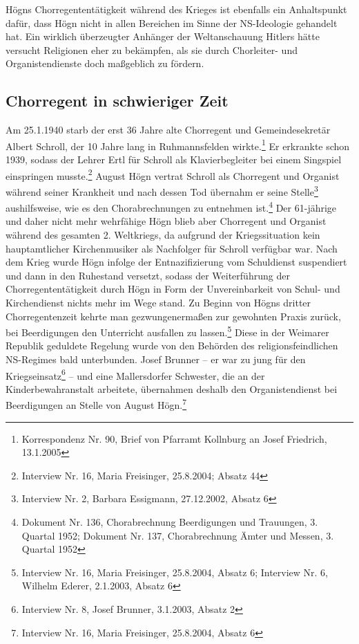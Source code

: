 \documentclass[a4paper]{article}
\begin{document}
Högns Chorregententätigkeit während des Krieges ist ebenfalls ein
Anhaltspunkt dafür, dass Högn nicht in allen Bereichen im Sinne der
NS-Ideologie gehandelt hat. Ein wirklich überzeugter Anhänger der
Weltanschauung Hitlers hätte versucht Religionen eher zu bekämpfen, als
sie durch Chorleiter- und Organistendienste doch maßgeblich zu fördern.

\subsection{Chorregent in schwieriger Zeit}
\hypertarget{RefHeadingToc100333735}{}Am 25.1.1940 starb der erst 36
Jahre alte Chorregent und Gemeindesekretär Albert Schroll, der 10 Jahre
lang in Ruhmannsfelden wirkte.\footnote{ Korrespondenz Nr. 90, Brief
von Pfarramt Kollnburg an Josef Friedrich, 13.1.2005} Er erkrankte
schon 1939, sodass der Lehrer Ertl für Schroll als Klavierbegleiter bei
einem Singspiel einspringen musste.\footnote{ Interview Nr. 16, Maria
Freisinger, 25.8.2004; Absatz 44} August Högn vertrat Schroll als
Chorregent und Organist während seiner Krankheit und nach dessen Tod
übernahm er seine Stelle\footnote{ Interview Nr. 2, Barbara Essigmann,
27.12.2002, Absatz 6} aushilfsweise, wie es den Chorabrechnungen zu
entnehmen ist.\footnote{ Dokument Nr. 136, Chorabrechnung Beerdigungen
und Trauungen, 3. Quartal 1952; Dokument Nr. 137, Chorabrechnung Ämter
und Messen, 3. Quartal 1952} Der 61-jährige und daher nicht mehr
wehrfähige Högn blieb aber Chorregent und Organist während des gesamten
2. Weltkriegs, da aufgrund der Kriegssituation kein hauptamtlicher
Kirchenmusiker als Nachfolger für Schroll verfügbar war. Nach dem Krieg
wurde Högn infolge der Entnazifizierung vom Schuldienst suspendiert und
dann in den Ruhestand versetzt, sodass der Weiterführung der
Chorregententätigkeit durch Högn in Form der Unvereinbarkeit von Schul-
und Kirchendienst nichts mehr im Wege stand. Zu Beginn von Högns
dritter Chorregentenzeit kehrte man gezwungenermaßen zur gewohnten
Praxis zurück, bei Beerdigungen den Unterricht ausfallen zu
lassen.\footnote{ Interview Nr. 16, Maria Freisinger, 25.8.2004, Absatz
6; Interview Nr. 6, Wilhelm Ederer, 2.1.2003, Absatz 6} Diese in der
Weimarer Republik geduldete Regelung wurde von den Behörden des
religionsfeindlichen NS-Regimes bald unterbunden. Josef Brunner – er
war zu jung für den Kriegseinsatz\footnote{ Interview Nr. 8, Josef
Brunner, 3.1.2003, Absatz 2} – und eine Mallersdorfer Schwester, die an
der Kinderbewahranstalt arbeitete, übernahmen deshalb den
Organistendienst bei Beerdigungen an Stelle von August Högn.\footnote{
Interview Nr. 16, Maria Freisinger, 25.8.2004, Absatz 6}
\end{document}
